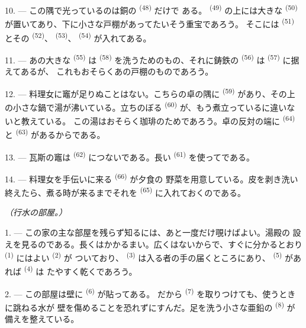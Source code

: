 10. --- この隅で光っているのは銅の \textsuperscript{(48)} だけで
ある。 \textsuperscript{(49)} の上には大きな
\textsuperscript{(50)} が置いてあり、下に小さな戸棚があってたいそう重宝であろう。
そこには \textsuperscript{(51)} とその
\textsuperscript{(52)}、 \textsuperscript{(53)}、
\textsuperscript{(54)} が入れてある。

\VUsaut{4.0mm}
\VUsaut{3.0mm}

11. --- あの大きな \textsuperscript{(55)} は
\textsuperscript{(58)} を洗うためのもの、それに鋳鉄の
\textsuperscript{(56)} は \textsuperscript{(57)} に据えてあるが、
これもおそらくあの戸棚のものであろう。

12. --- 料理女に竈が足りぬことはない。こちらの卓の隅に
\textsuperscript{(59)} があり、その上の小さな鍋で湯が沸いている。立ちのぼる
 \textsuperscript{(60)} が、もう煮立っているに違いないと教えている。
この湯はおそらく珈琲のためであろう。卓の反対の端に
\textsuperscript{(64)} と \textsuperscript{(63)} があるからである。

13. --- 瓦斯の竈は \textsuperscript{(62)} につないである。長い
 \textsuperscript{(61)} を使ってである。

14. --- 料理女を手伝いに来る \textsuperscript{(66)} が夕食の
野菜を用意している。皮を剥き洗い終えたら、煮る時が来るまでそれを
\textsuperscript{(65)} に入れておくのである。

\VUsaut{4.0mm}
{\centering\fontsize{10.2pt}{10.2pt}\selectfont{} \textit{（行水の部屋。）}\par}
\VUsaut{3.0mm}

1. --- この家の主な部屋を残らず知るには、あと一度だけ覗けばよい。湯殿の
設えを見るのである。長くはかかるまい。広くはないからで、すぐに分かるとおり
 \textsuperscript{(1)} にはよい \textsuperscript{(2)} が
ついており、 \textsuperscript{(3)} は入る者の手の届くところにあり、
 \textsuperscript{(5)} があれば \textsuperscript{(4)} は
たやすく乾くであろう。

2. --- この部屋は壁に \textsuperscript{(6)} が貼ってある。
だから \textsuperscript{(7)} を取りつけても、使うときに跳ねる水が
壁を傷めることを恐れずにすんだ。足を洗う小さな亜鉛の
\textsuperscript{(8)} が備えを整えている。
\VUsaut{6.0mm}
\VUfilet{22mm}
